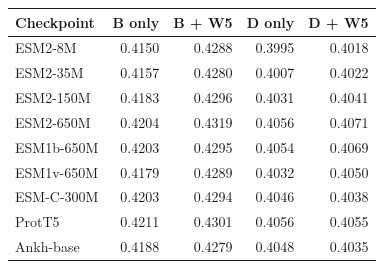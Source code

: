 
{\small\setlength{\tabcolsep}{4pt}
\begin{tabularx}{\textwidth}{Xrrrr}
\toprule
Checkpoint & B only & B + W5 & D only & D + W5 \\
\midrule
ESM2-8M & 0.4150 & 0.4288 & 0.3995 & 0.4018 \\
ESM2-35M & 0.4157 & 0.4280 & 0.4007 & 0.4022 \\
ESM2-150M & 0.4183 & 0.4296 & 0.4031 & 0.4041 \\
ESM2-650M & 0.4204 & 0.4319 & 0.4056 & 0.4071 \\
ESM1b-650M & 0.4203 & 0.4295 & 0.4054 & 0.4069 \\
ESM1v-650M & 0.4179 & 0.4289 & 0.4032 & 0.4050 \\
ESM-C-300M & 0.4203 & 0.4294 & 0.4046 & 0.4038 \\
ProtT5 & 0.4211 & 0.4301 & 0.4056 & 0.4055 \\
Ankh-base & 0.4188 & 0.4279 & 0.4048 & 0.4035 \\
\bottomrule
\end{tabularx}}
